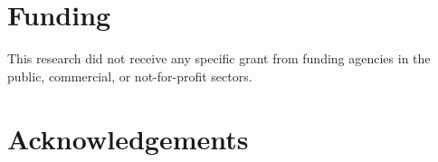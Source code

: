 \documentclass[preprint,12pt,a4paper]{elsarticle}
\begin{document}
\section*{Funding}
This research did not receive any specific grant from funding agencies in the
public, commercial, or not-for-profit sectors.

\section*{Acknowledgements}



\end{document}
